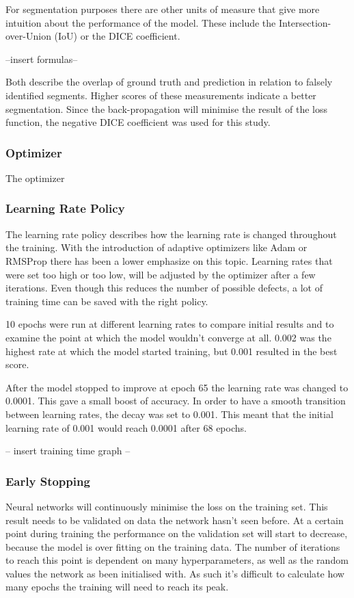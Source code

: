 For segmentation purposes there are other units of measure that give more intuition about the performance of the model. These include the Intersection-over-Union (IoU) or the DICE coefficient. 

--insert formulas--

Both describe the overlap of ground truth and prediction in relation to falsely identified segments. Higher scores of these measurements indicate a better segmentation. Since the back-propagation will minimise the result of the loss function, the negative DICE coefficient was used for this study.

\subsubsection{Optimizer}

The optimizer 

\subsubsection{Learning Rate Policy}

The learning rate policy describes how the learning rate is changed throughout the training. With the introduction of adaptive optimizers like Adam or RMSProp there has been a lower emphasize on this topic. Learning rates that were set too high or too low, will be adjusted by the optimizer after a few iterations. Even though this reduces the number of possible defects, a lot of training time can be saved with the right policy.

10 epochs were run at different learning rates to compare initial results and to examine the point at which the model wouldn't converge at all. 0.002 was the highest rate at which the model started training, but 0.001 resulted in the best score.

After the model stopped to improve at epoch 65 the learning rate was changed to 0.0001. This gave a small boost of accuracy. In order to have a smooth transition between learning rates, the decay was set to 0.001. This meant that the initial learning rate of 0.001 would reach 0.0001 after 68 epochs.

-- insert training time graph --

\subsubsection{Early Stopping}

Neural networks will continuously minimise the loss on the training set. This result needs to be validated on data the network hasn't seen before. At a certain point during training the performance on the validation set will start to decrease, because the model is over fitting on the training data. The number of iterations to reach this point is dependent on many hyperparameters, as well as the random values the network as been initialised with. As such it's difficult to calculate how many epochs the training will need to reach its peak.

